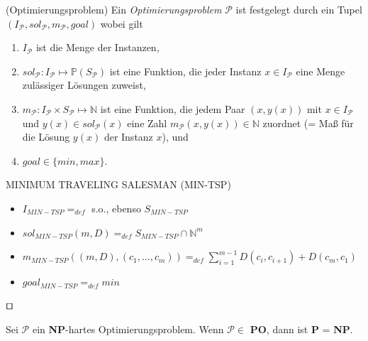 \begin{definition}(Optimierungsproblem)
Ein \emph{Optimierungsproblem} $\mathcal{P}$ ist festgelegt durch ein Tupel $(I_\mathcal{P}, sol_\mathcal{P}, m_\mathcal{P}, goal)$ wobei gilt

\begin{enumerate}
	\item $I_\mathcal{P}$ ist die Menge der Instanzen,
	\item $sol_\mathcal{P} : I_\mathcal{P} \longmapsto \mathbb{P}(S_\mathcal{P})$ ist eine Funktion, die jeder Instanz $x \in I_\mathcal{P}$ eine Menge zulässiger Lösungen zuweist,
	\item $m_\mathcal{P} : I_\mathcal{P} \times S_\mathcal{P} \longmapsto \mathbb{N}$ ist eine Funktion, die jedem Paar $(x,y(x))$ mit $x \in I_\mathcal{P}$ und $y(x) \in sol_\mathcal{P}(x)$ eine Zahl $m_\mathcal{P}(x,y(x)) \in \mathbb{N}$ zuordnet (= Maß für die Lösung $y(x)$ der Instanz $x$), und
	\item $goal \in \{min,max\}$.
\end{enumerate}
\end{definition}

\begin{example}
	MINIMUM TRAVELING SALESMAN (MIN-TSP)
	\begin{itemize}
		\item $I_{MIN-TSP} =_{def}$ s.o., ebenso $S_{MIN-TSP}$
		\item $sol_{MIN-TSP}(m,D) =_{def} S_{MIN-TSP} \cap \mathbb{N}^m$
		\item $m_{MIN-TSP}((m,D),(c_1, \ldots , c_m)) =_{def} \sum_{i=1}^{m-1} D(c_i, c_{i+1}) + D(c_m,c_1)$
		\item $goal_{MIN-TSP} =_{def} min$
	\end{itemize}
	\begin{flushright}$\qed$\end{flushright}
\end{example}

\begin{theorem}
Sei $\mathcal{P}$ ein \textbf{NP}-hartes Optimierungsproblem. Wenn $\mathcal{P} \in$ \textbf{PO}, dann ist \textbf{P} = \textbf{NP}.
\end{theorem}

